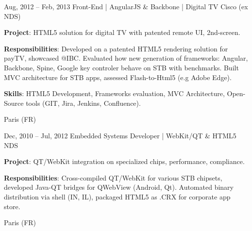 \documentclass[
  a4paper,
   maincolor=cvblue,
   sectioncolor=cvblue,
   sidebarwidth=0.323\paperwidth,
]{fortysecondscv}
\begin{document}
\begin{cvtableNew}
  \cvitemRightNew
    {Aug, 2012 – Feb, 2013} %
    {Front-End | AngularJS \& Backbone | Digital TV} %
    {Cisco (ex NDS)} %
    {
      \vspace{1pt}
      \fontsize{10.8pt}{12pt}\selectfont %
      \textbf{Project}: HTML5 solution for digital TV with patented remote UI, 2nd-screen.\par
      \vspace{4pt}
      \textbf{Responsibilities}: Developed on a patented HTML5 rendering solution for payTV, showcased @IBC. Evaluated how new generation of frameworks: Angular, Backbone, Spine, Google key controler behave on STB with benchmarks. Built MVC architecture for STB apps, assessed Flash-to-Html5 (e.g Adobe Edge).\par
      \vspace{4pt}
      \textbf{Skills}: HTML5 Development, Frameworks evaluation, MVC Architecture, Open-Source tools (GIT, Jira, Jenkins, Confluence).\par
    }
    {Paris (FR)} %

    \vspace{1.57mm} %

  \cvitemRightNew
    {Dec, 2010 – Jul, 2012} %
    {Embedded Systems Developer | WebKit/QT \& HTML5} %
    {NDS} %
    {
      \vspace{1pt}
      \fontsize{10.8pt}{12pt}\selectfont %
      \textbf{Project}: QT/WebKit integration on specialized chips, performance, compliance.\par
      \vspace{4pt}
      \textbf{Responsibilities}: Cross-compiled QT/WebKit for various STB chipsets, developed Java-QT bridges for QWebView (Android, Qt). Automated binary distribution via shell (IN, IL), packaged HTML5 as .CRX for corporate app store.\par
    }
    {Paris (FR)} %

    \vspace{1.57mm} %


\end{cvtableNew}
\end{document}
